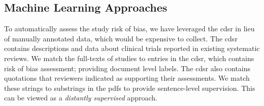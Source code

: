 \documentclass[runningheads,a4paper]{llncs}
\begin{document}



\subsection{Machine Learning Approaches}
To automatically assess the study risk of bias, we have leveraged the \ac{cdsr} in lieu of manually annotated data, which would be expensive to collect.
The \ac{cdsr} contains descriptions and data about clinical trials reported in existing systematic reviews.
We match the full-texts of studies to entries in the \ac{cdsr}, which contains risk of bias assessment; providing  document level labels.
The \ac{cdsr} also contains quotations that reviewers indicated as supporting their assessments.
We match these strings to substrings in the \acp{pdf} to provide sentence-level supervision.
This can be viewed as a \emph{distantly supervised} \cite{mintz-09,nguyen-11} approach.
\end{document}
